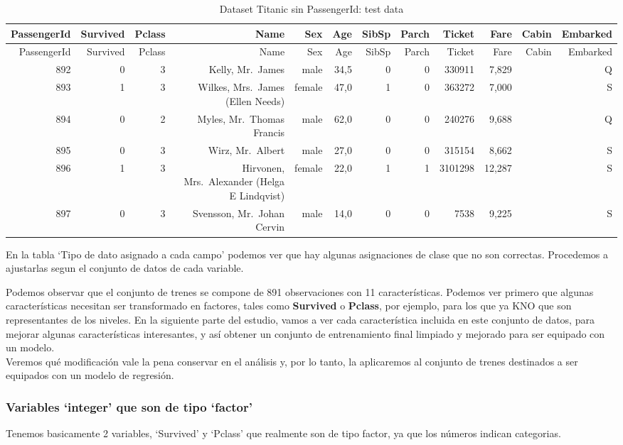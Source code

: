 \documentclass[]{article}
\begin{document}
\begin{longtable}[]{@{}rrrrrrrrrrrr@{}}
\caption{Dataset Titanic sin PassengerId: test data}\tabularnewline
\toprule
PassengerId & Survived & Pclass & Name & Sex & Age & SibSp & Parch &
Ticket & Fare & Cabin & Embarked\tabularnewline
\midrule
\endfirsthead
\toprule
PassengerId & Survived & Pclass & Name & Sex & Age & SibSp & Parch &
Ticket & Fare & Cabin & Embarked\tabularnewline
\midrule
\endhead
892 & 0 & 3 & Kelly, Mr.~James & male & 34,5 & 0 & 0 & 330911 & 7,829 &
& Q\tabularnewline
893 & 1 & 3 & Wilkes, Mrs.~James (Ellen Needs) & female & 47,0 & 1 & 0 &
363272 & 7,000 & & S\tabularnewline
894 & 0 & 2 & Myles, Mr.~Thomas Francis & male & 62,0 & 0 & 0 & 240276 &
9,688 & & Q\tabularnewline
895 & 0 & 3 & Wirz, Mr.~Albert & male & 27,0 & 0 & 0 & 315154 & 8,662 &
& S\tabularnewline
896 & 1 & 3 & Hirvonen, Mrs.~Alexander (Helga E Lindqvist) & female &
22,0 & 1 & 1 & 3101298 & 12,287 & & S\tabularnewline
897 & 0 & 3 & Svensson, Mr.~Johan Cervin & male & 14,0 & 0 & 0 & 7538 &
9,225 & & S\tabularnewline
\bottomrule
\end{longtable}

En la tabla `Tipo de dato asignado a cada campo' podemos ver que hay
algunas asignaciones de clase que no son correctas. Procedemos a
ajustarlas segun el conjunto de datos de cada variable.

Podemos observar que el conjunto de trenes se compone de 891
observaciones con 11 características. Podemos ver primero que algunas
características necesitan ser transformado en factores, tales como
\textbf{Survived} o \textbf{Pclass}, por ejemplo, para los que ya KNO
que son representantes de los niveles. En la siguiente parte del
estudio, vamos a ver cada característica incluida en este conjunto de
datos, para mejorar algunas características interesantes, y así obtener
un conjunto de entrenamiento final limpiado y mejorado para ser equipado
con un modelo.\\
Veremos qué modificación vale la pena conservar en el análisis y, por lo
tanto, la aplicaremos al conjunto de trenes destinados a ser equipados
con un modelo de regresión.

\subsubsection{\texorpdfstring{Variables `integer' que son de tipo
`factor'}{Variables integer que son de tipo factor}}\label{variables-integer-que-son-de-tipo-factor}

Tenemos basicamente 2 variables, `Survived' y `Pclass' que realmente son
de tipo factor, ya que los números indican categorias.
\end{document}
